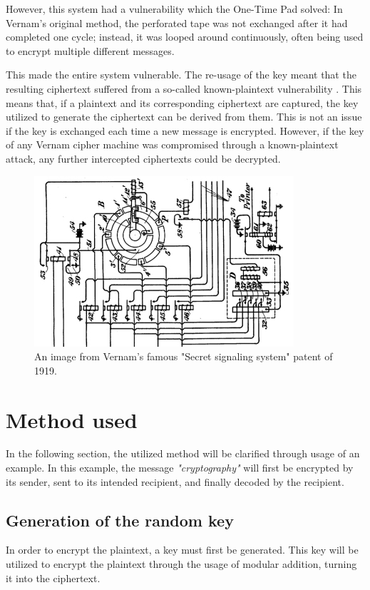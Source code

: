 \documentclass[12pt]{report}
\begin{document}
However, this system had a vulnerability which the One-Time Pad solved: In Vernam's original method, the perforated tape was not exchanged after it had completed one cycle; instead, it was looped around continuously, often being used to encrypt multiple different messages.

This made the entire system vulnerable. The re-usage of the key meant that the resulting ciphertext suffered from a so-called known-plaintext vulnerability \cite{HutSix}. This means that, if a plaintext and its corresponding ciphertext are captured, the key utilized to generate the ciphertext can be derived from them. This is not an issue if the key is exchanged each time a new message is encrypted. However, if the key of any Vernam cipher machine was compromised through a known-plaintext attack, any further intercepted ciphertexts could be decrypted.

\begin{figure}[H]
\centering
\includegraphics[scale=1]{VernamCipher.jpg}
\caption{An image from Vernam's famous "Secret signaling system" patent of 1919.}
\end{figure}    

\section{Method used}
In the following section, the utilized method will be clarified through usage of an example. In this example, the message \textit{"cryptography"} will first be encrypted by its sender, sent to its intended recipient, and finally decoded by the recipient.

\subsection{Generation of the random key}
In order to encrypt the plaintext, a key must first be generated. This key will be utilized to encrypt the plaintext through the usage of modular addition, turning it into the ciphertext.
\end{document}
